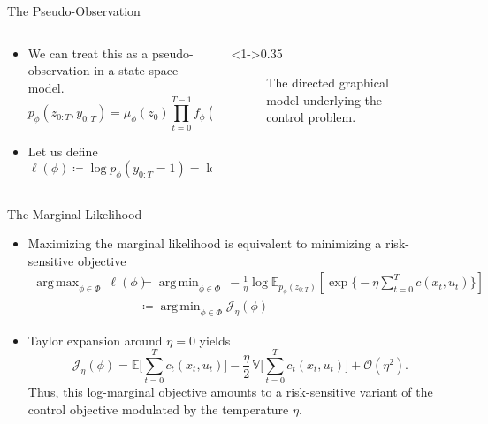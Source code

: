 \documentclass[10pt, aspectratio=1610]{beamer}
\DeclareMathOperator*{\argmin}{arg\,min}
\DeclareMathOperator*{\argmax}{arg\,max}
\begin{document}
    \begin{frame}{The Pseudo-Observation}
      \begin{columns}
        \begin{column}{0.65\textwidth}
          \begin{itemize}
            \item<1-> We can treat this as a pseudo-observation in a state-space model.
              \begin{equation}\label{eq:paper_1_ssm}
                p_{\phi}(z_{0:T}, y_{0:T}) = \mu_{\phi}(z_0) \prod_{t=0}^{T-1} f_{\phi}(z_{t+1} \mid z_t) \prod_{t=0}^T g(y_t \mid z_t).
              \end{equation}
            \item<2-> Let us define
              \begin{equation}
                \ell(\phi) \coloneq \log p_\phi(y_{0:T} = 1) = \log \mathbb{E}_{p_\phi(z_{0:T})} \bigl[ p(y_{0:T} = 1 \mid z_{0:T}) \bigr]
              \end{equation}
          \end{itemize}
        \end{column}
        \begin{column}<1->{0.35\textwidth}
          \begin{figure}[htbp]
            \centering
            
            \caption{The directed graphical model underlying the control problem.}
          \end{figure}
        \end{column}
      \end{columns}
    \end{frame}

    \begin{frame}{The Marginal Likelihood}
      \begin{itemize}
        \item Maximizing the marginal likelihood is equivalent to minimizing a risk-sensitive objective
          \begin{align}\label{eq:max_likelihood}
            \argmax_{\phi \in \Phi} \medspace \ell(\phi) &= \argmin_{\phi \in \Phi} \medspace -\frac{1}{\eta}\log \mathbb{E}_{p_{\phi}(z_{0:T})} \left[ \exp \big\{-\eta \textstyle \sum_{t=0}^{T} c(x_{t}, u_{t}) \big\} \right] \\
            &\coloneq \argmin_{\phi \in \Phi} \mathcal{J}_\eta(\phi)
          \end{align}
        \item Taylor expansion around $\eta = 0$ yields
          \begin{equation}
            \mathcal{J}_\eta(\phi) = \mathbb{E} \Bigg[ \sum_{t=0}^{T} c_{t}(x_{t}, u_{t}) \Bigg] - \frac{\eta}{2} \, \mathbb{V} \Bigg[ \sum_{t=0}^{T} c_{t}(x_{t}, u_{t}) \Bigg] + \mathcal{O}(\eta^{2}).
          \end{equation}
          Thus, this log-marginal objective amounts to a risk-sensitive variant of the control objective modulated by the temperature $\eta$.
      \end{itemize}
    \end{frame}
\end{document}
